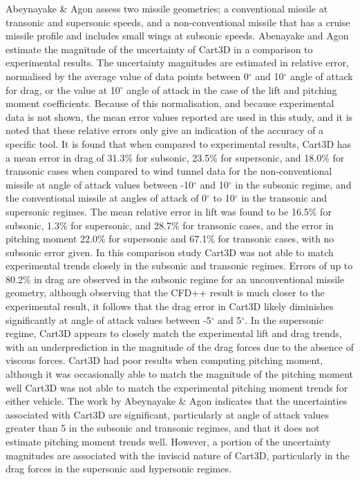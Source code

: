 Abeynayake \& Agon assess two missile geometries; a conventional missile at transonic and supersonic speeds, and a non-conventional missile that has a cruise missile profile and includes small wings at subsonic speeds\cite{Abeynayake2013a}. Abenayake and Agon estimate the magnitude of the uncertainty of Cart3D in a comparison to experimental results. The uncertainty magnitudes are estimated in relative error, normalised by the average value of data points between 0$^\circ$ and 10$^\circ$ angle of attack for drag, or the value at 10$^\circ$ angle of attack in the case of the lift and pitching moment coefficients\cite{Abeynayake2013a}. Because of this normalisation, and because experimental data is not shown\cite{Abeynayake2013a}, the mean error values reported are used in this study, and it is noted that these relative errors only give an indication of the accuracy of a specific tool\cite{Abeynayake2013a}. It is found that when compared to experimental results, Cart3D has a mean error in drag of 31.3\% for subsonic, 23.5\% for supersonic, and 18.0\% for transonic cases\cite{Abeynayake2013a} when compared to wind tunnel data for the non-conventional missile at angle of attack values between -10$^\circ$ and 10$^\circ$ in the subsonic regime, and the conventional missile at angles of attack of 0$^\circ$ to 10$^\circ$ in the transonic and supersonic regimes. The mean relative error in lift was found to be 16.5\% for subsonic, 1.3\% for supersonic, and 28.7\% for transonic cases\cite{Abeynayake2013a}, and the error in pitching moment 22.0\% for supersonic and 67.1\% for transonic cases, with no subsonic error given\cite{Abeynayake2013a}.
In this comparison study Cart3D was not able to match experimental trends closely in the subsonic and transonic regimes. Errors of up to 80.2\% in drag are observed in the subsonic regime for an unconventional missile geometry\cite{Abeynayake2013a}, although observing that the CFD++ result is much closer to the experimental result, it follows that the drag error in Cart3D likely diminishes significantly at angle of attack values between -5$^\circ$ and 5$^\circ$. In the supersonic regime, Cart3D appears to closely match the experimental lift and drag trends, with an underprediction in the magnitude of the drag forces due to the absence of viscous forces. 
Cart3D had poor results when computing pitching moment, although it was occasionally able to match the magnitude of the pitching moment well Cart3D was not able to match the experimental pitching moment trends for either vehicle\cite{Abeynayake2013a}. The work by Abeynayake \& Agon indicates that the uncertainties associated with Cart3D are significant, particularly at angle of attack values greater than 5 in the subsonic and transonic regimes, and that it does not estimate pitching moment trends well. However, a portion of the uncertainty magnitudes are associated with the inviscid nature of Cart3D, particularly in the drag forces in the supersonic and hypersonic regimes.

